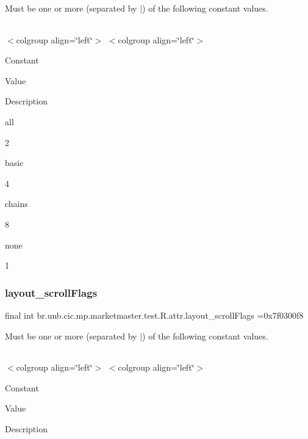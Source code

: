 Must be one or more (separated by \textquotesingle{}$\vert$\textquotesingle{}) of the following constant values.

\tabulinesep=1mm
\begin{longtabu} spread 0pt [c]{*{0}{|X[-1]}|}
\hline
\end{longtabu}
$<$colgroup align=\char`\"{}left\char`\"{}$>$ $<$colgroup align=\char`\"{}left\char`\"{}$>$ 

Constant

Value

Description 

all

2

basic

4

chains

8

none

1\mbox{\label{classbr_1_1unb_1_1cic_1_1mp_1_1marketmaster_1_1test_1_1R_1_1attr_a6f22dd41c42ba8a660634a65c2475654}} 
\subsubsection{\texorpdfstring{layout\+\_\+scroll\+Flags}{layout\_scrollFlags}}
{\footnotesize\ttfamily final int br.\+unb.\+cic.\+mp.\+marketmaster.\+test.\+R.\+attr.\+layout\+\_\+scroll\+Flags =0x7f0300f8\hspace{0.3cm}{\ttfamily [static]}}

Must be one or more (separated by \textquotesingle{}$\vert$\textquotesingle{}) of the following constant values.

\tabulinesep=1mm
\begin{longtabu} spread 0pt [c]{*{0}{|X[-1]}|}
\hline
\end{longtabu}
$<$colgroup align=\char`\"{}left\char`\"{}$>$ $<$colgroup align=\char`\"{}left\char`\"{}$>$ 

Constant

Value

Description 

